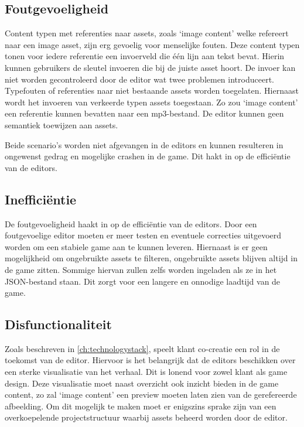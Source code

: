 \subsection{Foutgevoeligheid}
Content typen met referenties naar assets, zoals ‘image content’ welke refereert naar een image asset, zijn erg gevoelig voor menselijke fouten. Deze content typen tonen voor iedere referentie een invoerveld die één lijn aan tekst bevat. Hierin kunnen gebruikers de sleutel invoeren die bij de juiste asset hoort. De invoer kan niet worden gecontroleerd door de editor wat twee problemen introduceert. Typefouten of referenties naar niet bestaande assets worden toegelaten. Hiernaast wordt het invoeren van verkeerde typen assets toegestaan. Zo zou ‘image content’ een referentie kunnen bevatten naar een mp3-bestand. De editor kunnen geen semantiek toewijzen aan assets.

Beide scenario’s worden niet afgevangen in de editors en kunnen resulteren in ongewenst gedrag en mogelijke crashen in de game. Dit hakt in op de efficiëntie van de editors.

\subsection{Inefficiëntie}
De foutgevoeligheid haakt in op de efficiëntie van de editors. Door een foutgevoelige editor moeten er meer testen en eventuele correcties uitgevoerd worden om een stabiele game aan te kunnen leveren.
Hiernaast is er geen mogelijkheid om ongebruikte assets te filteren, ongebruikte assets blijven altijd in de game zitten. Sommige hiervan zullen zelfs worden ingeladen als ze in het JSON-bestand staan. Dit zorgt voor een langere en onnodige laadtijd van de game.

\subsection{Disfunctionaliteit}
Zoals beschreven in \autoref{ch:technologystack}, speelt klant co-creatie een rol in de toekomst van de editor. Hiervoor is het belangrijk dat de editors beschikken over een sterke visualisatie van het verhaal\cite{Schipper2015}. Dit is lonend voor zowel klant als game design. Deze visualisatie moet naast overzicht ook inzicht bieden in de game content, zo zal ‘image content’ een preview moeten laten zien van de gerefereerde afbeelding. Om dit mogelijk te maken moet er enigszins sprake zijn van een overkoepelende projectstructuur waarbij assets beheerd worden door de editor. 


